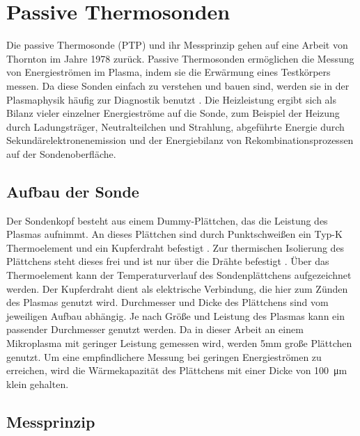\section{Passive Thermosonden}
Die passive Thermosonde (PTP) und ihr Messprinzip gehen auf eine Arbeit von Thornton \cite{thorntonSubstrateHeatingCylindrical1978} im Jahre 1978 zurück. 
Passive Thermosonden ermöglichen die Messung von Energieströmen im Plasma, indem sie die Erwärmung eines Testkörpers messen. Da diese Sonden einfach zu verstehen und bauen sind, werden sie in der Plasmaphysik häufig zur Diagnostik benutzt \cite{benediktFoundationsMeasurementElectrons2021,gauterCalorimetricProbeMeasurements2017,rosenfeldtUsePassiveThermal2021a}.
Die Heizleistung ergibt sich als Bilanz vieler einzelner Energieströme auf die Sonde, zum Beispiel der Heizung durch Ladungsträger, Neutralteilchen und Strahlung, abgeführte Energie durch Sekundärelektronenemission und der Energiebilanz von Rekombinationsprozessen auf der Sondenoberfläche. 

\subsection{Aufbau der Sonde}
Der Sondenkopf besteht aus einem Dummy-Plättchen, das die Leistung des Plasmas aufnimmt. An dieses Plättchen sind durch Punktschweißen ein Typ-K Thermoelement und ein Kupferdraht befestigt \cite{haaseDynamicDeterminationSecondary2018}. Zur thermischen Isolierung des Plättchens steht dieses frei und ist nur über die Drähte befestigt \cite{kewitzInvestigationCommercialAtmospheric2015,cipoDiagnosticsProcessPlasma2020}. Über das Thermoelement kann der Temperaturverlauf des Sondenplättchens aufgezeichnet werden. Der Kupferdraht dient als elektrische Verbindung, die hier zum Zünden des Plasmas genutzt wird. Durchmesser und Dicke des Plättchens sind vom jeweiligen Aufbau abhängig. Je nach Größe und Leistung des Plasmas kann ein passender Durchmesser genutzt werden. Da in dieser Arbeit an einem Mikroplasma mit geringer Leistung gemessen wird, werden 5mm große Plättchen genutzt. Um eine empfindlichere Messung bei geringen Energieströmen zu erreichen, wird die Wärmekapazität des Plättchens mit einer Dicke von \qty{100}{\um} klein gehalten.

\subsection{Messprinzip}\label{messprinzip}

